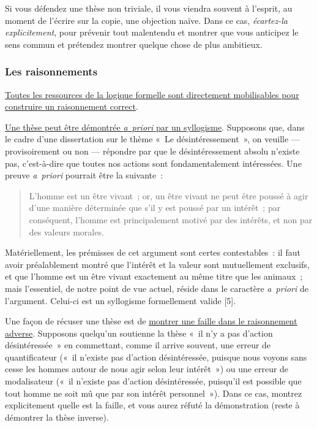 \documentclass[a4paper,12pt]{article}
\begin{document}
Si vous défendez une thèse non triviale, il vous viendra souvent à
l'esprit, au moment de l'écrire sur la copie, une objection naïve. Dans
ce cas, \emph{écartez-la explicitement}, pour prévenir tout malentendu et
montrer que vous anticipez le sens commun et prétendez montrer quelque
chose de plus ambitieux.


\subsubsection{Les raisonnements}
\label{sec:org5afdd1c}

\uline{Toutes les ressources de la logique formelle sont directement
mobilisables pour construire un raisonnement correct}.

\uline{Une thèse peut être démontrée \emph{a} \emph{priori} par un syllogisme}.
Supposons que, dans le cadre d'une dissertation sur le thème « Le
désintéressement », on veuille --- provisoirement ou non --- répondre
par que le désintéressement absolu n'existe pas, c'est-à-dire que toutes
nos actions sont fondamentalement intéressées. Une preuve \emph{a priori}
pourrait être la suivante :
\begin{quote}
L'homme est un être vivant ; or, un être vivant ne peut être poussé à
agir d'une manière déterminée que s'il y est poussé par un intérêt ;
par conséquent, l'homme est principalement motivé par des intérêts, et
non par des valeurs morales.
\end{quote}
Matériellement, les prémisses de cet argument sont certes contestables :
il faut avoir préalablement montré que l'intérêt et la valeur sont
mutuellement exclusifs, et que l'homme est un être vivant exactement au
même titre que les animaux ; mais l'essentiel, de notre point de vue
actuel, réside dans le caractère \emph{a priori} de l'argument. Celui-ci est
un syllogisme formellement valide [5].

Une façon de récuser une thèse est de \uline{montrer une faille dans le
raisonnement adverse}. Supposons quelqu'un soutienne la thèse « il n'y a
pas d'action désintéressée » en commettant, comme il arrive souvent, une
erreur de quantificateur (« il n'existe pas d'action désintéressée,
puisque nous voyons sans cesse les hommes autour de nous agir selon leur
intérêt ») ou une erreur de modalisateur (« il n'existe pas d'action
désintéressée, puisqu'il est possible que tout homme ne soit mû que par
son intérêt personnel »). Dans ce cas, montrez explicitement quelle est
la faille, et vous aurez réfuté la démonstration (reste à démontrer la
thèse inverse).
\end{document}

